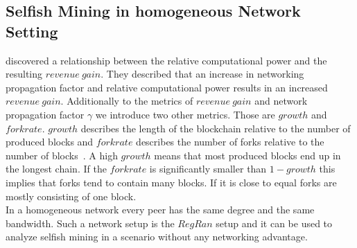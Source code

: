 \subsection{Selfish Mining in homogeneous Network Setting}
 discovered a relationship between the relative computational power and the resulting $revenue~gain$. They described that an increase in networking propagation factor and relative computational power results in an increased $revenue~gain$. Additionally to the metrics of $revenue~gain$ and network propagation factor $\gamma$ we introduce two other metrics. Those are $growth$ and $forkrate$. $growth$ describes the length of the blockchain relative to the number of produced blocks and $forkrate$ describes the number of forks relative to the number of blocks~\cite{BlockPropOld}. A high $growth$ means that most produced blocks end up in the longest chain. If the $forkrate$ is significantly smaller than $1-growth$ this implies that forks tend to contain many blocks. If it is close to equal forks are mostly consisting of one block.\\
In a homogeneous network every peer has the same degree and the same bandwidth. Such a network setup is the $RegRan$ setup and it can be used to analyze selfish mining in a scenario without any networking advantage.
